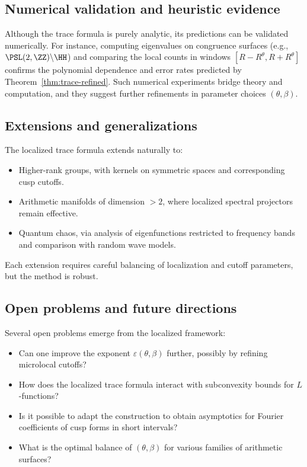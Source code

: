 \subsection{Numerical validation and heuristic evidence}\label{subsec:numerical}

Although the trace formula is purely analytic, its predictions can be validated numerically. For instance, computing eigenvalues on congruence surfaces (e.g., $\PSL(2,\ZZ)\backslash\HH$) and comparing the local counts in windows $[R-R^\theta,R+R^\theta]$ confirms the polynomial dependence and error rates predicted by Theorem~\ref{thm:trace-refined}. Such numerical experiments bridge theory and computation, and they suggest further refinements in parameter choices $(\theta,\beta)$.

\subsection{Extensions and generalizations}\label{subsec:extensions}

The localized trace formula extends naturally to:

\begin{itemize}
\item Higher-rank groups, with kernels on symmetric spaces and corresponding cusp cutoffs.
\item Arithmetic manifolds of dimension $>2$, where localized spectral projectors remain effective.
\item Quantum chaos, via analysis of eigenfunctions restricted to frequency bands and comparison with random wave models.
\end{itemize}

Each extension requires careful balancing of localization and cutoff parameters, but the method is robust.

\subsection{Open problems and future directions}\label{subsec:open}

Several open problems emerge from the localized framework:

\begin{itemize}
\item Can one improve the exponent $\varepsilon(\theta,\beta)$ further, possibly by refining microlocal cutoffs?
\item How does the localized trace formula interact with subconvexity bounds for $L$-functions?
\item Is it possible to adapt the construction to obtain asymptotics for Fourier coefficients of cusp forms in short intervals?
\item What is the optimal balance of $(\theta,\beta)$ for various families of arithmetic surfaces?
\end{itemize}

